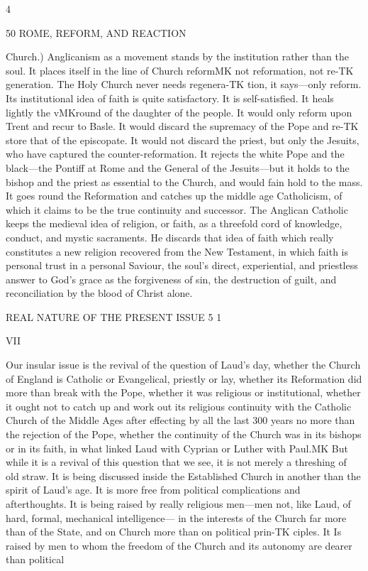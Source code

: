 \documentclass[12pt,a5paper,oneside]{book}
\begin{document}
4 



50 ROME, REFORM, AND REACTION 

Church.) Anglicanism as a movement stands by the 
institution rather than the soul. It places itself in 
the line of Church reformMK not reformation, not re-TK
generation. The Holy Church never needs regenera-TK
tion, it says---only reform. Its institutional idea of 
faith is quite satisfactory. It is self-satisfied. It heals 
lightly the vMKround of the daughter of the people. It 
would only reform upon Trent and recur to Basle. 
It would discard the supremacy of the Pope and re-TK
store that of the episcopate. It would not discard the 
priest, but only the Jesuits, who have captured the 
counter-reformation. It rejects the white Pope and 
the black---the Pontiff at Rome and the General of 
the Jesuits---but it holds to the bishop and the priest 
as essential to the Church, and would fain hold to the 
mass. It goes round the Reformation and catches up 
the middle age Catholicism, of which it claims to be 
the true continuity and successor. The Anglican 
Catholic keeps the medieval idea of religion, or faith, 
as a threefold cord of knowledge, conduct, and mystic 
sacraments. He discards that idea of faith which 
really constitutes a new religion recovered from the 
New Testament, in which faith is personal trust in a 
personal Saviour, the soul's direct, experiential, and 
priestless answer to God's grace as the forgiveness of 
sin, the destruction of guilt, and reconciliation by the 
blood of Christ alone. 



REAL NATURE OF THE PRESENT ISSUE 5 1 

VII 

Our insular issue is the revival of the question of 
Laud's day, whether the Church of England is 
Catholic or Evangelical, priestly or lay, whether its 
Reformation did more than break with the Pope, 
whether it was religious or institutional, whether it 
ought not to catch up and work out its religious 
continuity with the Catholic Church of the Middle 
Ages after effecting by all the last 300 years no 
more than the rejection of the Pope, whether the 
continuity of the Church was in its bishops or in 
its faith, in what linked Laud with Cyprian or Luther 
with Paul.MK But while it is a revival of this question 
that we see, it is not merely a threshing of old straw. 
It is being discussed inside the Established Church in 
another than the spirit of Laud's age. It is more 
free from political complications and afterthoughts. 
It is being raised by really religious men---men not, 
like Laud, of hard, formal, mechanical intelligence---
in the interests of the Church far more than of the 
State, and on Church more than on political prin-TK
ciples. It Is raised by men to whom the freedom of 
the Church and its autonomy are dearer than political 
\end{document}
